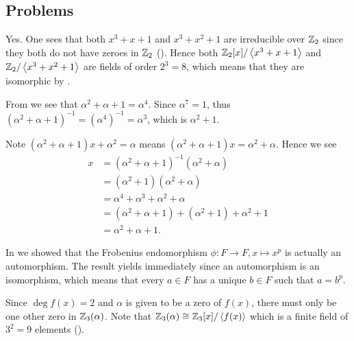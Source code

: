 \subsection*{Problems}
\begin{questions}
    \item Yes. One sees that both $x^3 + x + 1$ and $x^3 + x^2 + 1$ are irreducible over $\mathbb{Z}_2$ since they both do not have zeroes in $\mathbb{Z}_2$ (). Hence both $\mathbb{Z}_2[x]/\left\langle x^3+x+1\right\rangle$ and $\mathbb{Z}_2/\left\langle x^3+x^2+1\right\rangle$ are fields of order $2^3 = 8$, which means that they are isomorphic by .

    \item \begin{partquestions}{\roman*}
        \item From  we see that $\alpha^2 + \alpha + 1 = \alpha^4$. Since $\alpha^7 = 1$, thus $(\alpha^2 + \alpha + 1)^{-1} = (\alpha^4)^{-1} = \alpha^3$, which is $\alpha^2 + 1$.

        \item Note $(\alpha^2 + \alpha + 1)x + \alpha^2 = \alpha$ means $(\alpha^2 + \alpha + 1)x = \alpha^2 + \alpha$. Hence we see
        \begin{align*}
            x &= (\alpha^2+\alpha+1)^{-1}(\alpha^2 + \alpha)\\
            &= (\alpha^2 + 1)(\alpha^2 + \alpha)\\
            &= \alpha^4 + \alpha^3 + \alpha^2 + \alpha\\
            &= (\alpha^2 + \alpha + 1) + (\alpha^2 + 1) + \alpha^2 + 1\\
            &= \alpha^2 + \alpha + 1.
        \end{align*}
    \end{partquestions}

    \item In  we showed that the Frobenius endomorphism $\phi: F \to F, x \mapsto x^p$ is actually an automorphism. The result yields immediately since an automorphism is an isomorphism, which means that every $a \in F$ has a unique $b \in F$ such that $a = b^p$.

    \item Since $\deg f(x) = 2$ and $\alpha$ is given to be a zero of $f(x)$, there must only be one other zero in $\mathbb{Z}_3(\alpha)$. Note that $\mathbb{Z}_3(\alpha) \cong \mathbb{Z}_3[x]/\left\langle f(x)\right\rangle$ which is a finite field of $3^2 = 9$ elements ().


\end{questions}
